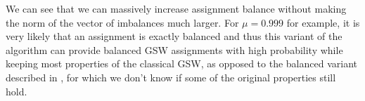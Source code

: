 \documentclass[12pt]{article}
\begin{document}
We can see that we can massively increase assignment balance without making the norm of the vector of imbalances much larger. For $\mu=0.999$ for example, it is very likely that an assignment is exactly balanced and thus this variant of the algorithm can provide balanced GSW assignments with high probability while keeping most properties of the classical GSW, as opposed to the balanced variant described in \cite{harshaw2019balancing}, for which we don't know if some of the original properties still hold. %

%
%
%



\end{document}
